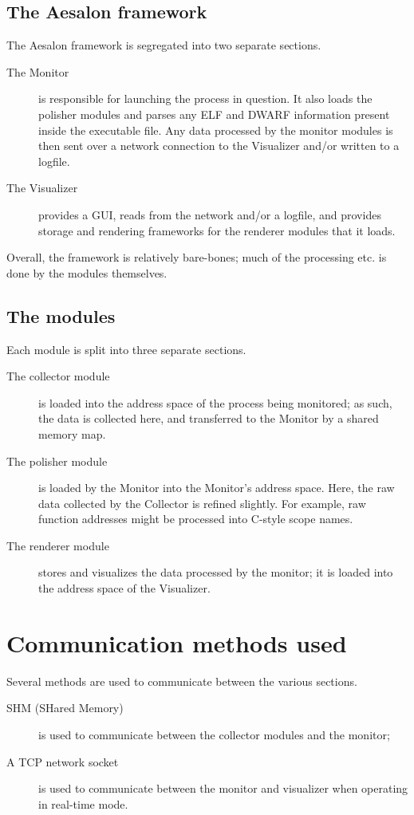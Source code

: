 \subsection{The Aesalon framework}
The Aesalon framework is segregated into two separate sections.
\flushleft
\begin{description}
 \item[\textnormal{The} Monitor] is responsible for launching the process in question. It also loads the polisher
modules
  and parses any ELF and DWARF information present inside the executable file. Any data processed by the
  monitor modules is then sent over a network connection to the Visualizer and/or written to a logfile.
 \item[\textnormal{The} Visualizer] provides a GUI, reads from the network and/or a logfile, and provides storage and
rendering
  frameworks for the renderer modules that it loads.
\end{description}

Overall, the framework is relatively bare-bones; much of the processing etc. is done by the modules themselves.

\subsection{The modules}
Each module is split into three separate sections.
\flushleft
\begin{description}
 \item[\textnormal{The} collector module] is loaded into the address space of the process being monitored; as such, the
  data is collected here, and transferred to the Monitor by a shared memory map.
 \item[\textnormal{The} polisher module] is loaded by the Monitor into the Monitor's address space. Here, the raw data
collected by the Collector is refined slightly. For example, raw function addresses might be processed into C-style
scope names.
 \item[\textnormal{The} renderer module] stores and visualizes the data processed by the monitor; it is loaded into the
address space of the Visualizer.
\end{description}

\section{Communication methods used}
Several methods are used to communicate between the various sections.
\flushleft
\begin{description}
 \item[SHM (SHared Memory)] is used to communicate between the collector modules and the monitor;
 \item[\textnormal{A} TCP network socket] is used to communicate between the monitor and visualizer when operating in
  real-time mode.
\end{description}